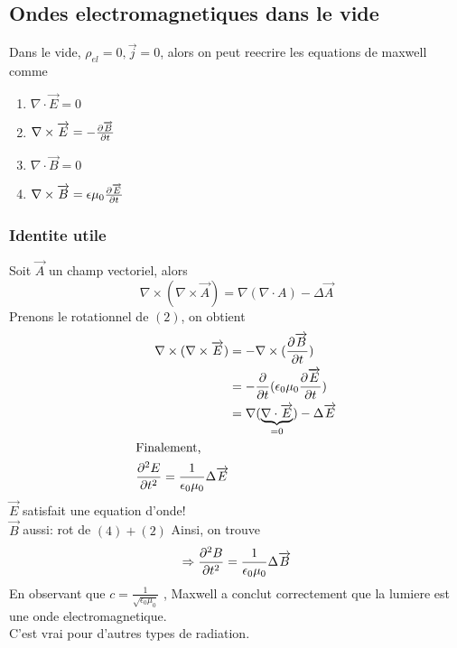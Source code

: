 \documentclass[../main.tex]{subfiles}
\begin{document}
\subsection{Ondes electromagnetiques dans le vide}
Dans le vide, $\rho_{el} = 0, \vec{j} = 0$, alors on peut reecrire les equations de maxwell comme
\begin{enumerate}
\item $\nabla \cdot \vec{E} = 0$ 
\item $\nabla \times \overrightarrow{E} = - \frac{\partial \overrightarrow{B}}{\partial t}$ 
\item $\nabla\cdot \vec{B} = 0$ 
\item $\nabla \times \overrightarrow{B} = \epsilon \mu_0 \frac{\partial \overrightarrow{E}}{\partial t}$ 
\end{enumerate}
\subsubsection*{Identite utile}

Soit $\vec{A}$ un champ vectoriel, alors
\[ 
	\nabla \times ( \nabla \times \vec{A}) = \nabla ( \nabla \cdot A) - \Delta \vec{A}
\]
Prenons le rotationnel de $ ( 2) $, on obtient
\begin{align*}
	\nabla \times ( \nabla \times \overrightarrow{E}) &= - \nabla \times ( \frac{\partial \overrightarrow{B}}{\partial t}) \\
					       &=  - \frac{\partial}{\partial t}(  \epsilon_0 \mu_0 \frac{\partial \overrightarrow{E}}{\partial t}) \\
					       &= \nabla ( \underbrace{\nabla \cdot \overrightarrow{E}}_{ = 0}) - \Delta \overrightarrow{E}\\
					       \intertext{Finalement, }
					       \frac{\partial ^{2} E}{\partial t ^{2}}= \frac{1}{\epsilon_0 \mu_0 }\Delta \overrightarrow{E}
\end{align*}
$\vec{E}$ satisfait une equation d'onde!\\
$\vec{B}$ aussi: rot de $( 4) + ( 2) $ 
Ainsi, on trouve 
\[ 
\Rightarrow \frac{\partial ^{2}B}{\partial t^{2}}= \frac{1}{\epsilon_0 \mu_0} \Delta \overrightarrow{B}
\]
En observant que $c= \frac{1}{ \sqrt{\epsilon_0 \mu_0} }$ , Maxwell a conclut correctement que la lumiere est une onde electromagnetique.\\
C'est vrai pour d'autres types de radiation.
\end{document}
